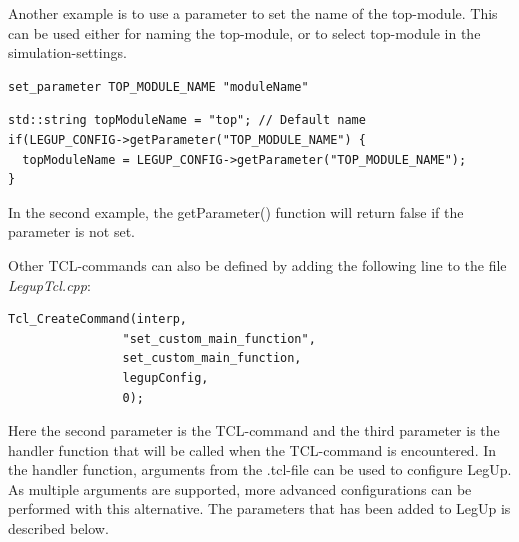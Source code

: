 Another example is to use a parameter to set the name of the top-module. This can be used either for naming the top-module, or to select top-module in the simulation-settings. 
\begin{verbatim}
set_parameter TOP_MODULE_NAME "moduleName"
\end{verbatim}
\begin{lstlisting}
std::string topModuleName = "top"; // Default name
if(LEGUP_CONFIG->getParameter("TOP_MODULE_NAME") {
  topModuleName = LEGUP_CONFIG->getParameter("TOP_MODULE_NAME");
}
\end{lstlisting}
In the second example, the getParameter() function will return false if the parameter is not set.

Other TCL-commands can also be defined by adding the following line to the file \textit{LegupTcl.cpp}:
\begin{lstlisting}
Tcl_CreateCommand(interp,
                "set_custom_main_function",
                set_custom_main_function,
                legupConfig,
                0);
\end{lstlisting}
Here the second parameter is the TCL-command and the third parameter is the handler function that will be called when the TCL-command is encountered. In the handler function, arguments from the .tcl-file can be used to configure LegUp. As multiple arguments are supported, more advanced configurations can be performed with this alternative. The parameters that has been added to LegUp is described below.


